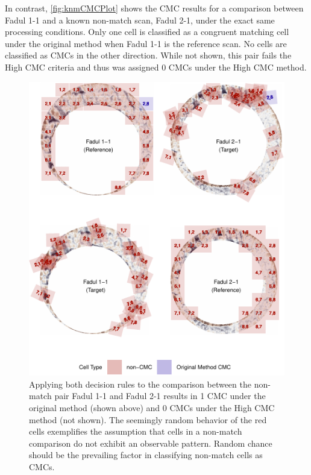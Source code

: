 In contrast, \autoref{fig:knmCMCPlot} shows the CMC results for a
comparison between Fadul 1-1 and a known non-match scan, Fadul 2-1,
under the exact same processing conditions. Only one cell is classified
as a congruent matching cell under the original method when Fadul 1-1 is
the reference scan. No cells are classified as CMCs in the other
direction. While not shown, this pair fails the High CMC criteria and
thus was assigned 0 CMCs under the High CMC method.

\begin{Schunk}
\begin{figure}[htbp]

{\centering \includegraphics[width=\textwidth]{figures/knmOriginalMethod} 

}

\caption{\label{fig:knmCMCPlot} Applying both decision rules to the comparison between the non-match pair Fadul 1-1 and Fadul 2-1 results in 1 CMC under the original method (shown above) and 0 CMCs under the High CMC method (not shown). The seemingly random behavior of the red cells exemplifies the assumption that cells in a non-match comparison do not exhibit an observable pattern. Random chance should be the prevailing factor in classifying non-match cells as CMCs.}\label{fig:unnamed-chunk-18}
\end{figure}
\end{Schunk}

